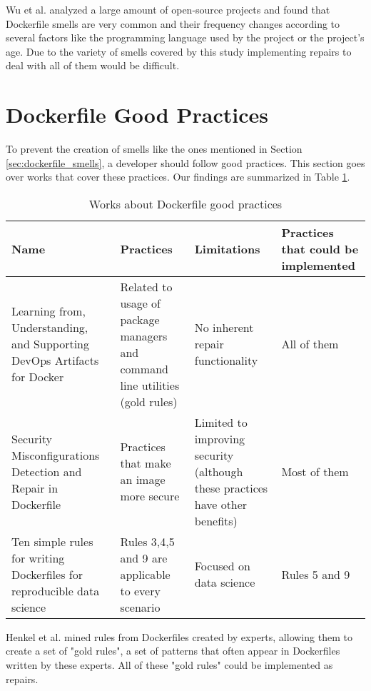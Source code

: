 Wu et al. \cite{wuCharacterizingOccurrenceDockerfile2020} analyzed a large amount of open-source projects and found that Dockerfile smells are very common and their frequency changes according to several factors like the programming language used by the project or the project's age. Due to the variety of smells covered by this study implementing repairs to deal with all of them would be difficult. 

\section{Dockerfile Good Practices} \label{sec:dockerfile_good_practices}

To prevent the creation of smells like the ones mentioned in Section \ref{sec:dockerfile_smells}, a developer should follow good practices. This section goes over works that cover these practices. Our findings are summarized in Table \ref{tab:works_dockerfile_good_practices}.

\begin{table}[H]
    \centering
    \begin{tabular}{|p{}|p{}|p{}|p{}|}
        \hline \textbf{Name} & \textbf{Practices} & \textbf{Limitations} & \textbf{Practices that could be implemented} \\
        \hline Learning from, Understanding, and Supporting DevOps Artifacts for Docker \cite{henkelLearningUnderstandingSupporting2020} & Related to usage of package managers and command line utilities (gold rules) & No inherent repair functionality & All of them \\
        \hline Security Misconfigurations Detection and Repair in Dockerfile \cite{prinettoSecurityMisconfigurationsDetection} & Practices that make an image more secure & Limited to improving security (although these practices have other benefits) & Most of them \\
        \hline Ten simple rules for writing Dockerfiles for reproducible data science \cite{nustTenSimpleRules2020} & Rules 3,4,5 and 9 are applicable to every scenario & Focused on data science & Rules 5 and 9 \\
        \hline
    \end{tabular} 
    \caption{Works about Dockerfile good practices}
    \label{tab:works_dockerfile_good_practices}
\end{table}

Henkel et al. \cite{henkelLearningUnderstandingSupporting2020} mined rules from Dockerfiles created by experts, allowing them to create a set of "gold rules", a set of patterns that often appear in Dockerfiles written by these experts. All of these "gold rules" could be implemented as repairs.

